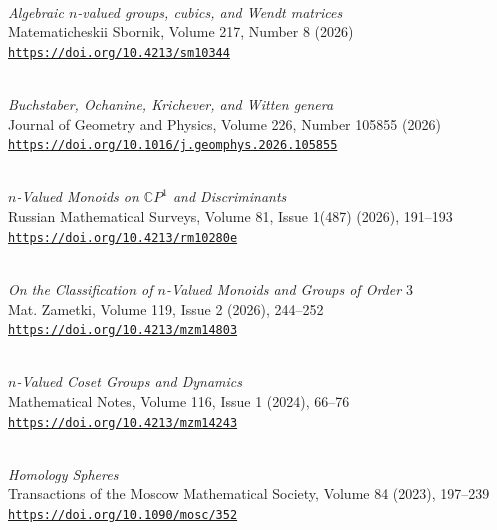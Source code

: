 \documentclass[11pt,letterpaper]{report}
\begin{document}
    \begin{tablist}
         \item[Jul. 2026] \\ {\it Algebraic $n$-valued groups, cubics, and Wendt matrices}\\ Matematicheskii Sbornik, Volume 217, Number 8 (2026)\\ \href{https://doi.org/10.4213/sm10344}{\tt https://doi.org/10.4213/sm10344}
        \item[Apr. 2026] \\ {\it Buchstaber, Ochanine, Krichever, and Witten genera}\\ Journal of Geometry and Physics, Volume 226, Number 105855 (2026)\\ \href{https://doi.org/10.1016/j.geomphys.2026.105855}{\tt https://doi.org/10.1016/j.geomphys.2026.105855}
        \item[Jan. 2026] \\ {\it $n$-Valued Monoids on $\mathbb{C}P^1$ and Discriminants} \\ Russian Mathematical Surveys, Volume 81, Issue 1(487) (2026),  191–193 \\ \href{https://doi.org/10.4213/rm10280e}{\tt https://doi.org/10.4213/rm10280e}
	\item[Jan. 2026] \\ {\it On the Classification of $n$-Valued Monoids and Groups of Order $3$} \\ Mat. Zametki, Volume 119, Issue 2 (2026), 244–252 \\ \href{https://doi.org/10.4213/mzm14803}{\tt https://doi.org/10.4213/mzm14803} 
	\item[Jan. 2024] \\ {\it $n$-Valued Coset Groups and Dynamics}\\ Mathematical Notes, Volume 116, Issue 1 (2024), 66–76 \\ \href{https://doi.org/10.4213/mzm14243}{\tt https://doi.org/10.4213/mzm14243}
        \item[Sep. 2023] \\ {\it Homology Spheres}\\ Transactions of the Moscow Mathematical Society, Volume 84 (2023),  197–239 \href{https://doi.org/10.1090/mosc/352}{\tt https://doi.org/10.1090/mosc/352}
        
    \end{tablist}
    
\end{document}
